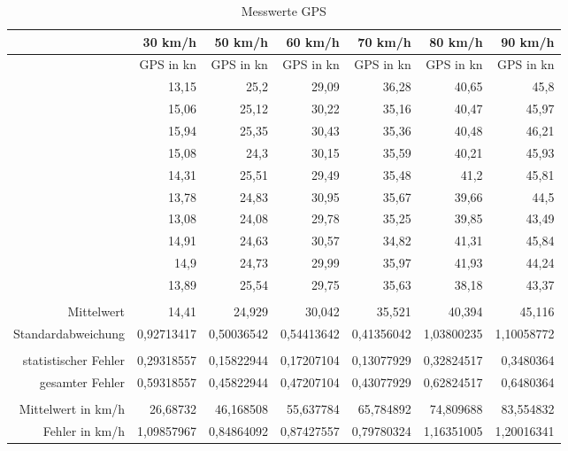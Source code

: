 \begin{table}[htbp]
  \centering
  \caption{Messwerte GPS}
    \begin{tabular}{rrrrrrr}
    \toprule
          & 30 km/h & 50 km/h & 60 km/h & 70 km/h & 80 km/h & 90 km/h \\
    \midrule
          & GPS in kn & GPS in kn & GPS in kn & GPS in kn & GPS in kn & GPS in kn \\
          & 13,15 & 25,2  & 29,09 & 36,28 & 40,65 & 45,8 \\
          & 15,06 & 25,12 & 30,22 & 35,16 & 40,47 & 45,97 \\
          & 15,94 & 25,35 & 30,43 & 35,36 & 40,48 & 46,21 \\
          & 15,08 & 24,3  & 30,15 & 35,59 & 40,21 & 45,93 \\
          & 14,31 & 25,51 & 29,49 & 35,48 & 41,2  & 45,81 \\
          & 13,78 & 24,83 & 30,95 & 35,67 & 39,66 & 44,5 \\
          & 13,08 & 24,08 & 29,78 & 35,25 & 39,85 & 43,49 \\
          & 14,91 & 24,63 & 30,57 & 34,82 & 41,31 & 45,84 \\
          & 14,9  & 24,73 & 29,99 & 35,97 & 41,93 & 44,24 \\
          & 13,89 & 25,54 & 29,75 & 35,63 & 38,18 & 43,37 \\
          &       &       &       &       &       &  \\
    Mittelwert & 14,41 & 24,929 & 30,042 & 35,521 & 40,394 & 45,116 \\
    Standardabweichung & 0,92713417 & 0,50036542 & 0,54413642 & 0,41356042 & 1,03800235 & 1,10058772 \\
          &       &       &       &       &       &  \\
    statistischer Fehler & 0,29318557 & 0,15822944 & 0,17207104 & 0,13077929 & 0,32824517 & 0,3480364 \\
    gesamter Fehler & 0,59318557 & 0,45822944 & 0,47207104 & 0,43077929 & 0,62824517 & 0,6480364 \\
          &       &       &       &       &       &  \\
    Mittelwert in km/h & 26,68732 & 46,168508 & 55,637784 & 65,784892 & 74,809688 & 83,554832 \\
    Fehler in km/h & 1,09857967 & 0,84864092 & 0,87427557 & 0,79780324 & 1,16351005 & 1,20016341 \\
    \bottomrule
    \end{tabular}%
  \label{tab:GPS}%
\end{table}%

